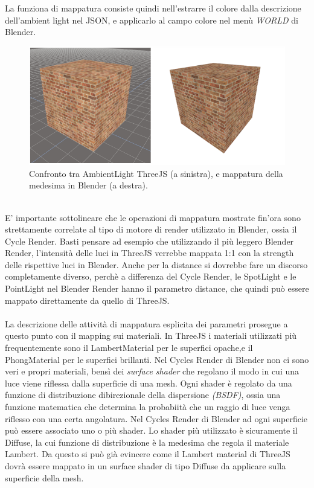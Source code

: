 La funziona di mappatura consiste quindi nell’estrarre il colore dalla descrizione dell’ambient light nel JSON, e applicarlo al campo colore nel menù \emph{WORLD} di Blender.
\\
\begin{figure}[htb]
 \centering
 \includegraphics[width=1\linewidth]{images/chapter_baking_service/ba_se_confronto_cubi.png}\hfill
 \caption[Mappatura AmbientLight]{Confronto tra AmbientLight ThreeJS (a sinistra), e mappatura della medesima in Blender (a destra).}
 \label{fig:ba_se_confronto_cubi}
\end{figure}
\\
E’ importante sottolineare che le operazioni di mappatura mostrate fin’ora sono strettamente correlate al tipo di motore di render utilizzato in Blender, ossia il Cycle Render. Basti pensare ad esempio che utilizzando il più leggero Blender Render, l’intensità delle luci in ThreeJS verrebbe mappata 1:1 con la strength delle rispettive luci in Blender. Anche per la distance si dovrebbe fare un discorso completamente diverso, perchè a differenza del Cycle Render, le SpotLight e le PointLight nel Blender Render hanno il parametro distance, che quindi può essere mappato direttamente da quello di ThreeJS.
\\
\\
La descrizione delle attività di mappatura esplicita dei parametri prosegue a questo punto con il mapping sui materiali.
In ThreeJS i materiali utilizzati più frequentemente sono il LambertMaterial per le superfici opache,e il PhongMaterial per le superfici brillanti.
Nel Cycles Render di Blender non ci sono veri e propri materiali, bensì dei \emph{surface shader} che regolano il modo in cui una luce viene riflessa dalla superficie di una mesh. Ogni shader è regolato da una funzione di distribuzione dibirezionale della dispersione \emph{(BSDF)}, ossia una funzione matematica che determina la probabiità che un raggio di luce venga riflesso con una certa angolatura. Nel Cycles Render di Blender ad ogni superficie può essere associato uno o più shader. Lo shader più utilizzato è sicuramente il Diffuse, la cui funzione di distribuzione è la medesima che regola il materiale Lambert. Da questo si può già evincere come il Lambert material di ThreeJS dovrà essere mappato in un surface shader di tipo Diffuse da applicare sulla superficie della mesh. 
